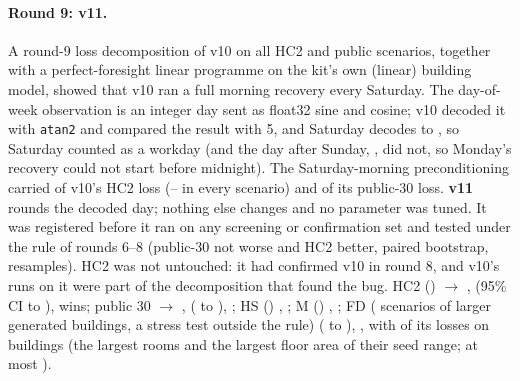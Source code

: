 \documentclass{article}
\begin{document}
\paragraph{Round 9: v11.}
A round-9 loss decomposition of v10 on all \RNineNDecomp{} HC2 and public scenarios, together with a perfect-foresight
linear programme on the kit's own (linear) building model, showed that v10 ran a full morning recovery every Saturday.
The day-of-week observation is an integer day sent as float32 sine and cosine; v10 decoded it with \texttt{atan2} and
compared the result with 5, and Saturday decodes to \RNineSatDecode, so Saturday counted as a workday (and the day after
Sunday, \RNineSunDecode, did not, so Monday's recovery could not start before midnight). The Saturday-morning
preconditioning carried \RNineSatShareHCTwo{} of v10's HC2 loss (\RNineSatShareHCTwoMin--\RNineSatShareHCTwoMax{} in
every scenario) and \RNineSatSharePub{} of its public-30 loss. \textbf{v11} rounds the decoded day; nothing else changes
and no parameter was tuned. It was registered before it ran on any screening or confirmation set and tested under the
rule of rounds 6--8 (public-30 not worse and HC2 better, paired bootstrap, \RNineNBoot{} resamples). HC2 was not
untouched: it had confirmed v10 in round 8, and v10's runs on it were part of the decomposition that found the bug.
HC2 (\RNineConfHarshCTwoN) \RNineConfHarshCTwoRef{} $\to$ \RNineConfHarshCTwoCand, \RNineConfHarshCTwoRel{} (95\% CI
\RNineConfHarshCTwoRelLo{} to \RNineConfHarshCTwoRelHi), \RNineConfHarshCTwoWins{} wins; public 30 \RNineConfPubRef{}
$\to$ \RNineConfPubCand, \RNineConfPubRel{} (\RNineConfPubRelLo{} to \RNineConfPubRelHi), \RNineConfPubWins; HS
(\RNineConfHarshSN) \RNineConfHarshSRel, \RNineConfHarshSWins; M (\RNineConfMinnN) \RNineConfMinnRel,
\RNineConfMinnWins; FD (\RNineConfFreshDefN{} scenarios of \RNineFDNBuild{} larger generated buildings, a stress test
outside the rule) \RNineConfFreshDefRel{} (\RNineConfFreshDefRelLo{} to \RNineConfFreshDefRelHi),
\RNineConfFreshDefWins, with \RNineFDTopTwoLosses{} of its \RNineConfFreshDefLosses{} losses on buildings
\RNineFDTopTwoBuild{} (the largest rooms and the largest floor area of their seed range; at most
\RNineConfFreshDefWorstRel).
\end{document}
